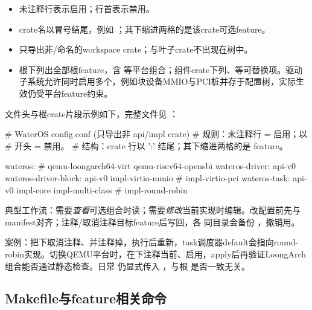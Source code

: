 \begin{itemize}
 \item 未注释行表示启用；行首\code{\#}表示禁用。
 \item crate名以冒号结尾，例如 ；其下缩进两格的是该crate可选feature。
 \item 只导出非/命名的workspace crate；与叶子crate不出现在树中。
 \item 根下列出全部根feature，含  等平台组合；组件crate下列、等可替换项。驱动子系统允许同时启用多个，例如块设备MMIO与PCI桩并存于配置树，实际生效仍受平台feature约束。
\end{itemize}

文件头与根crate片段示例如下，完整文件见 ：

\begin{textcode}
# WaterOS config.conf (只导出非 api/impl crate)
# 规则：未注释行 = 启用；以 # 开头 = 禁用。
# 结构：crate 行以 ':' 结尾；其下缩进两格的是 feature。

wateros:
  # qemu-loongarch64-virt
  qemu-riscv64-opensbi
  wateros-driver:
    api-v0
    wateros-driver-block:
      api-v0
      impl-virtio-mmio
      # impl-virtio-pci
  wateros-task:
    api-v0
    impl-core
    impl-multi-class
    # impl-round-robin
\end{textcode}

典型工作流：需要\emph{查看}可选组合时读；需要\emph{修改}当前实现时编辑。改配置前先与manifest对齐；注释/取消注释目标feature后写回，各  同目录会备份 ，撤销用。

案例：把下取消注释、并注释掉，执行后重新，task调度器default会指向round-robin实现。切换QEMU平台时，在下注释当前、启用，apply后再验证LoongArch组合能否通过静态检查。日常  仍显式传入 ，与根  是否一致无关。


\subsection{Makefile与feature相关命令}\label{sec:feature-config-make}

